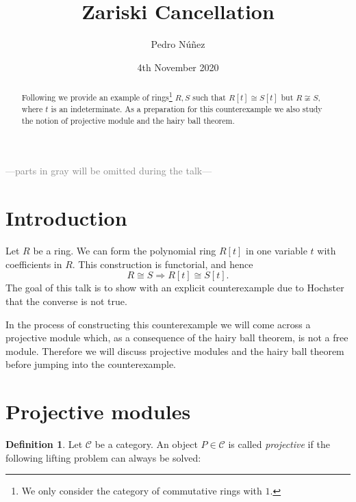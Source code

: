 \documentclass[A4paper, 12pt, british, reqno]{amsart}
\author{Pedro N\'{u}\~{n}ez}
\title[Zariski Cancellation]{Zariski Cancellation}
\date{4th November 2020}
\newcommand{\calC}{\mathcal{C}}
\theoremstyle{plain}
\theoremstyle{definition}
\newtheorem{defn}[thm]{Definition}
\theoremstyle{remark}
\theoremstyle{plain}
\theoremstyle{definition}
\theoremstyle{remark}
\theoremstyle{plain}
\theoremstyle{definition}
\theoremstyle{remark}
\begin{document}

\maketitle

\begin{abstract}
    Following \cite{hoc72} we provide an example of rings\footnote{We only consider the category of commutative rings with $1$.} $R,S$ such that $R[t]\cong S[t]$ but $R\not\cong S$, where $t$ is an indeterminate.
    As a preparation for this counterexample we also study the notion of projective module and the hairy ball theorem.	
\end{abstract}

\tableofcontents

\begin{center}
    \textcolor{gray}{---parts in gray will be omitted during the talk---}
\end{center}

\section{Introduction}

Let $R$ be a ring.
We can form the polynomial ring $R[t]$ in one variable $t$ with coefficients in $R$.
This construction is functorial, and hence
\[ R\cong S \Rightarrow R[t]\cong S[t]. \]
The goal of this talk is to show with an explicit counterexample due to Hochster \cite{hoc72} that the converse is not true.

In the process of constructing this counterexample we will come across a projective module which, as a consequence of the hairy ball theorem, is not a free module.
Therefore we will discuss projective modules and the hairy ball theorem before jumping into the counterexample.

\section{Projective modules}

\begin{defn}
    Let $\calC$ be a category.
    An object $P\in \calC$ is called \textit{projective} if the following lifting problem can always be solved:
    
    \begin{center}
    \end{center}
\end{defn}
\end{document}
